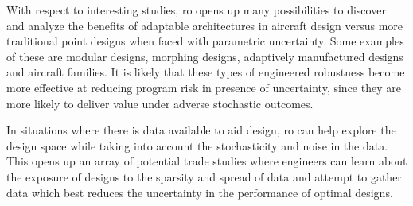 With respect to interesting studies, \gls{ro} opens up many possibilities to discover and analyze the benefits
of adaptable architectures in aircraft design versus more traditional point designs
when faced with parametric uncertainty. Some examples of these are modular designs, morphing designs,
adaptively manufactured designs and aircraft families. It is likely that these types of engineered
robustness become more effective at reducing program risk in presence of uncertainty, since they are more likely
to deliver value under adverse stochastic outcomes.

In situations where there is data available to aid design, \gls{ro} can help explore
the design space while taking into account the stochasticity and noise in the data.
This opens up an array of potential trade studies where engineers can learn about
the exposure of designs to the sparsity and spread of data and attempt to gather
data which best reduces the uncertainty in the performance of optimal designs.
